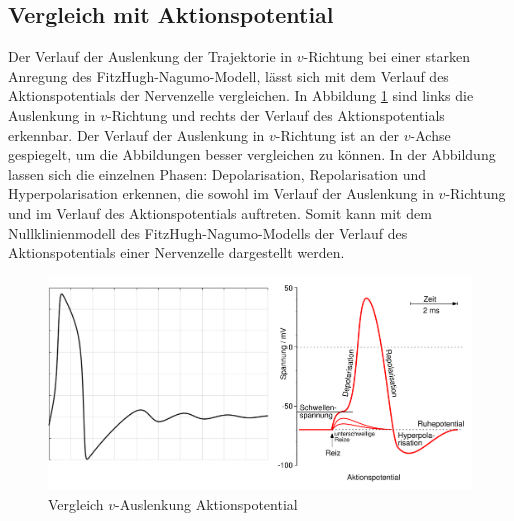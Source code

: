 \begin{refsection}
\subsection{Vergleich mit Aktionspotential}
Der Verlauf der Auslenkung der Trajektorie in $v$-Richtung bei einer starken Anregung des FitzHugh-Nagumo-Modell, lässt
sich mit dem Verlauf des Aktionspotentials der Nervenzelle vergleichen. 
In Abbildung \ref{fig:Vergleich} sind links die Auslenkung in $v$-Richtung und rechts der Verlauf des Aktionspotentials
erkennbar.
Der Verlauf der Auslenkung in $v$-Richtung ist an der $v$-Achse gespiegelt, um die Abbildungen besser vergleichen zu können.
In der Abbildung lassen sich die einzelnen Phasen: Depolarisation, Repolarisation und Hyperpolarisation erkennen, die
sowohl im Verlauf der Auslenkung in $v$-Richtung und im Verlauf des Aktionspotentials auftreten.
Somit kann mit dem Nullklinienmodell des FitzHugh-Nagumo-Modells der Verlauf des Aktionspotentials einer Nervenzelle
dargestellt werden.
\begin{figure}[h]
    \centering
    \includegraphics[width=\textwidth]{papers/nerven/Bilder/Vergleich.png}
    \caption{Vergleich $v$-Auslenkung Aktionspotential}
    \label{fig:Vergleich}
\end{figure}
\printbibliography[heading=subbibliography]
\end{refsection}